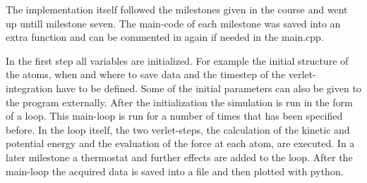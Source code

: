 The implementation itself followed the milestones given in the course and went up untill milestone seven. 
The main-code of each milestone was saved into an extra function and can be commented in again if needed in the main.cpp.

\par 
In the first step all variables are initialized. For example the initial structure of the atoms, when and where to save data and the timestep of the verlet-integration have to be defined. Some of the initial parameters can also be given to the program externally. After the initialization the simulation is run in the form of a loop. This main-loop is run for a number of times that has been specified before. In the loop itself, the two verlet-steps, the calculation of the kinetic and potential energy and the evaluation of the force at each atom, are executed. In a later milestone a thermostat and further effects are added to the loop. 
After the main-loop the acquired data is saved into a file and then plotted with python. 

\par 



